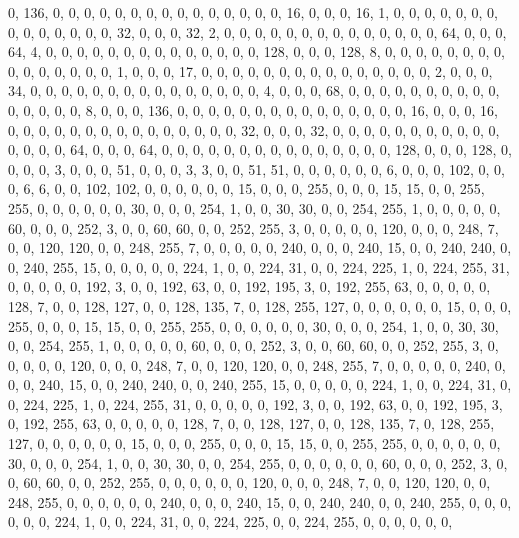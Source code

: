 \begin{DoxyCode}
       0, 136, 0, 0, 0, 0, 0, 0, 0, 0, 0, 0, 0, 0, 0, 0, 0, 16, 0, 0, 0, 16, 1, 0, 0, 0, 0, 0, 0, 0, 0, 0, 0, 0,
       0, 0, 0, 32, 0, 0, 0, 32, 2, 0, 0, 0, 0, 0, 0, 0, 0, 0, 0, 0, 0, 0, 0, 64, 0, 0, 0, 64, 4, 0, 0, 0, 0, 0, 0,
       0, 0, 0, 0, 0, 0, 0, 0, 128, 0, 0, 0, 128, 8, 0, 0, 0, 0, 0, 0, 0, 0, 0, 0, 0, 0, 0, 0, 0, 1, 0, 0, 0, 17,
       0, 0, 0, 0, 0, 0, 0, 0, 0, 0, 0, 0, 0, 0, 0, 2, 0, 0, 0, 34, 0, 0, 0, 0, 0, 0, 0, 0, 0, 0, 0, 0, 0, 0, 0, 4,
       0, 0, 0, 68, 0, 0, 0, 0, 0, 0, 0, 0, 0, 0, 0, 0, 0, 0, 0, 8, 0, 0, 0, 136, 0, 0, 0, 0, 0, 0, 0, 0, 0, 0, 0,
       0, 0, 0, 0, 16, 0, 0, 0, 16, 0, 0, 0, 0, 0, 0, 0, 0, 0, 0, 0, 0, 0, 0, 0, 32, 0, 0, 0, 32, 0, 0, 0, 0, 0, 0,
       0, 0, 0, 0, 0, 0, 0, 0, 0, 64, 0, 0, 0, 64, 0, 0, 0, 0, 0, 0, 0, 0, 0, 0, 0, 0, 0, 0, 0, 128, 0, 0, 0, 128,
       0, 0, 0, 0, 3, 0, 0, 0, 51, 0, 0, 0, 3, 3, 0, 0, 51, 51, 0, 0, 0, 0, 0, 0, 6, 0, 0, 0, 102, 0, 0, 0, 6, 6,
       0, 0, 102, 102, 0, 0, 0, 0, 0, 0, 15, 0, 0, 0, 255, 0, 0, 0, 15, 15, 0, 0, 255, 255, 0, 0, 0, 0, 0, 0, 30,
       0, 0, 0, 254, 1, 0, 0, 30, 30, 0, 0, 254, 255, 1, 0, 0, 0, 0, 0, 60, 0, 0, 0, 252, 3, 0, 0, 60, 60, 0, 0,
       252, 255, 3, 0, 0, 0, 0, 0, 120, 0, 0, 0, 248, 7, 0, 0, 120, 120, 0, 0, 248, 255, 7, 0, 0, 0, 0, 0, 240, 0, 0,
       0, 240, 15, 0, 0, 240, 240, 0, 0, 240, 255, 15, 0, 0, 0, 0, 0, 224, 1, 0, 0, 224, 31, 0, 0, 224, 225, 1, 0,
       224, 255, 31, 0, 0, 0, 0, 0, 192, 3, 0, 0, 192, 63, 0, 0, 192, 195, 3, 0, 192, 255, 63, 0, 0, 0, 0, 0, 128,
       7, 0, 0, 128, 127, 0, 0, 128, 135, 7, 0, 128, 255, 127, 0, 0, 0, 0, 0, 0, 15, 0, 0, 0, 255, 0, 0, 0, 15, 15,
       0, 0, 255, 255, 0, 0, 0, 0, 0, 0, 30, 0, 0, 0, 254, 1, 0, 0, 30, 30, 0, 0, 254, 255, 1, 0, 0, 0, 0, 0, 60,
       0, 0, 0, 252, 3, 0, 0, 60, 60, 0, 0, 252, 255, 3, 0, 0, 0, 0, 0, 120, 0, 0, 0, 248, 7, 0, 0, 120, 120, 0, 0,
       248, 255, 7, 0, 0, 0, 0, 0, 240, 0, 0, 0, 240, 15, 0, 0, 240, 240, 0, 0, 240, 255, 15, 0, 0, 0, 0, 0, 224,
       1, 0, 0, 224, 31, 0, 0, 224, 225, 1, 0, 224, 255, 31, 0, 0, 0, 0, 0, 192, 3, 0, 0, 192, 63, 0, 0, 192, 195,
       3, 0, 192, 255, 63, 0, 0, 0, 0, 0, 128, 7, 0, 0, 128, 127, 0, 0, 128, 135, 7, 0, 128, 255, 127, 0, 0, 0, 0,
       0, 0, 15, 0, 0, 0, 255, 0, 0, 0, 15, 15, 0, 0, 255, 255, 0, 0, 0, 0, 0, 0, 30, 0, 0, 0, 254, 1, 0, 0, 30,
       30, 0, 0, 254, 255, 0, 0, 0, 0, 0, 0, 60, 0, 0, 0, 252, 3, 0, 0, 60, 60, 0, 0, 252, 255, 0, 0, 0, 0, 0, 0,
       120, 0, 0, 0, 248, 7, 0, 0, 120, 120, 0, 0, 248, 255, 0, 0, 0, 0, 0, 0, 240, 0, 0, 0, 240, 15, 0, 0, 240, 240,
       0, 0, 240, 255, 0, 0, 0, 0, 0, 0, 224, 1, 0, 0, 224, 31, 0, 0, 224, 225, 0, 0, 224, 255, 0, 0, 0, 0, 0, 0,

\end{DoxyCode}
